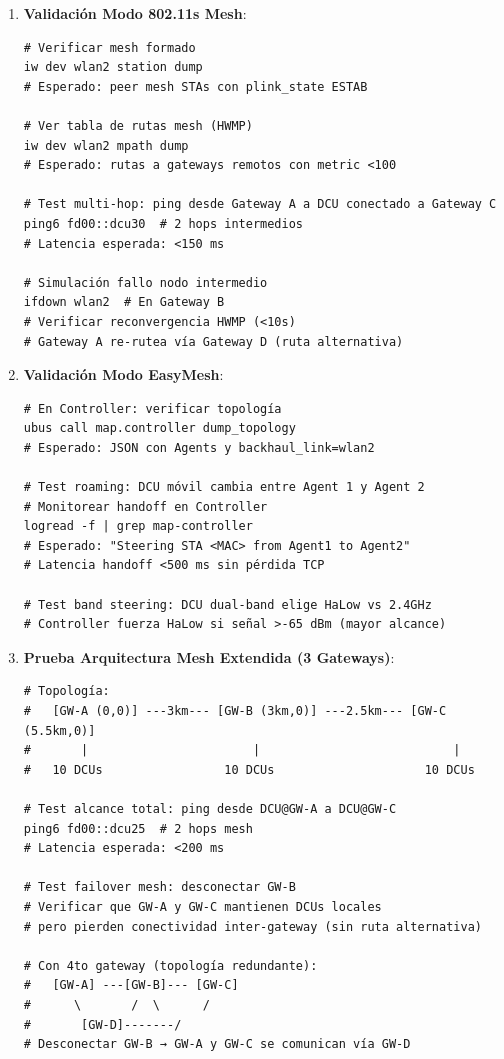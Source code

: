 \begin{enumerate}
    \item \textbf{Validación Modo 802.11s Mesh}:
    \begin{verbatim}
# Verificar mesh formado
iw dev wlan2 station dump
# Esperado: peer mesh STAs con plink_state ESTAB

# Ver tabla de rutas mesh (HWMP)
iw dev wlan2 mpath dump
# Esperado: rutas a gateways remotos con metric <100

# Test multi-hop: ping desde Gateway A a DCU conectado a Gateway C
ping6 fd00::dcu30  # 2 hops intermedios
# Latencia esperada: <150 ms

# Simulación fallo nodo intermedio
ifdown wlan2  # En Gateway B
# Verificar reconvergencia HWMP (<10s)
# Gateway A re-rutea vía Gateway D (ruta alternativa)
    \end{verbatim}
    
    \item \textbf{Validación Modo EasyMesh}:
    \begin{verbatim}
# En Controller: verificar topología
ubus call map.controller dump_topology
# Esperado: JSON con Agents y backhaul_link=wlan2

# Test roaming: DCU móvil cambia entre Agent 1 y Agent 2
# Monitorear handoff en Controller
logread -f | grep map-controller
# Esperado: "Steering STA <MAC> from Agent1 to Agent2"
# Latencia handoff <500 ms sin pérdida TCP

# Test band steering: DCU dual-band elige HaLow vs 2.4GHz
# Controller fuerza HaLow si señal >-65 dBm (mayor alcance)
    \end{verbatim}
    
    \item \textbf{Prueba Arquitectura Mesh Extendida (3 Gateways)}:
    \begin{verbatim}
# Topología:
#   [GW-A (0,0)] ---3km--- [GW-B (3km,0)] ---2.5km--- [GW-C (5.5km,0)]
#       |                       |                           |
#   10 DCUs                 10 DCUs                     10 DCUs

# Test alcance total: ping desde DCU@GW-A a DCU@GW-C
ping6 fd00::dcu25  # 2 hops mesh
# Latencia esperada: <200 ms

# Test failover mesh: desconectar GW-B
# Verificar que GW-A y GW-C mantienen DCUs locales
# pero pierden conectividad inter-gateway (sin ruta alternativa)

# Con 4to gateway (topología redundante):
#   [GW-A] ---[GW-B]--- [GW-C]
#      \       /  \      /
#       [GW-D]-------/
# Desconectar GW-B → GW-A y GW-C se comunican vía GW-D
    \end{verbatim}
    

\end{enumerate}
